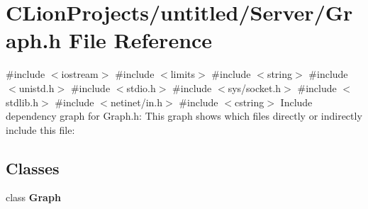 \section{C\+Lion\+Projects/untitled/\+Server/\+Graph.h File Reference}
\label{_graph_8h}
{\ttfamily \#include $<$iostream$>$}\newline
{\ttfamily \#include $<$limits$>$}\newline
{\ttfamily \#include $<$string$>$}\newline
{\ttfamily \#include $<$unistd.\+h$>$}\newline
{\ttfamily \#include $<$stdio.\+h$>$}\newline
{\ttfamily \#include $<$sys/socket.\+h$>$}\newline
{\ttfamily \#include $<$stdlib.\+h$>$}\newline
{\ttfamily \#include $<$netinet/in.\+h$>$}\newline
{\ttfamily \#include $<$cstring$>$}\newline
Include dependency graph for Graph.\+h\+:
This graph shows which files directly or indirectly include this file\+:
\subsection*{Classes}
\begin{DoxyCompactItemize}
\item 
class \textbf{ Graph}
\end{DoxyCompactItemize}
